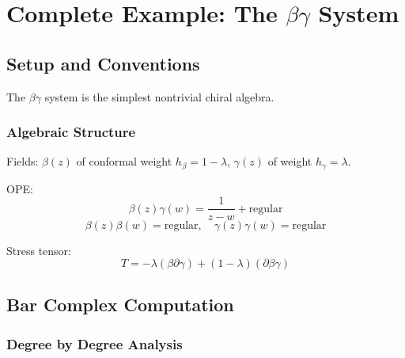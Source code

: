\chapter{Complete Example: The $\beta\gamma$ System}

\section{Setup and Conventions}

The $\beta\gamma$ system is the simplest nontrivial chiral algebra.

\subsection{Algebraic Structure}

Fields: $\beta(z)$ of conformal weight $h_\beta = 1 - \lambda$, $\gamma(z)$ of weight $h_\gamma = \lambda$.

OPE:
$$\beta(z)\gamma(w) = \frac{1}{z-w} + \text{regular}$$
$$\beta(z)\beta(w) = \text{regular}, \quad \gamma(z)\gamma(w) = \text{regular}$$

Stress tensor:
$$T = -\lambda(\beta\partial\gamma) + (1-\lambda)(\partial\beta\gamma)$$

\section{Bar Complex Computation}

\subsection{Degree by Degree Analysis}

